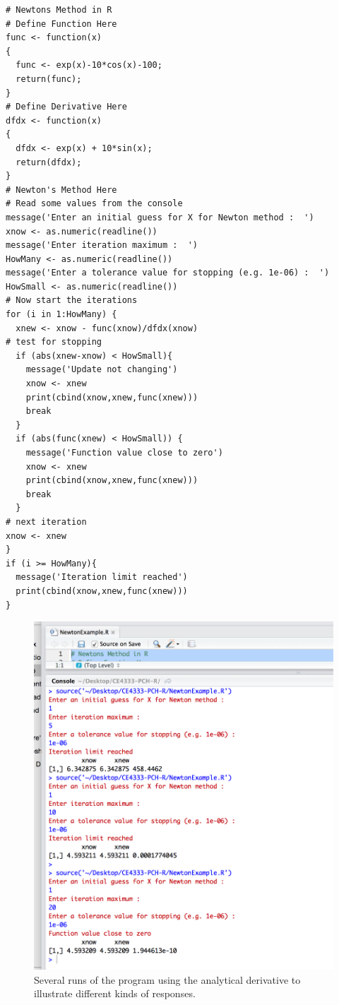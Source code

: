 \newpage
\begin{lstlisting}[caption=R code demonstrating Newton's Method calculations, label=lst:NewtonsMethod]
# Newtons Method in R
# Define Function Here
func <- function(x)
{
  func <- exp(x)-10*cos(x)-100;
  return(func);
}
# Define Derivative Here
dfdx <- function(x)
{
  dfdx <- exp(x) + 10*sin(x); 
  return(dfdx);
}
# Newton's Method Here
# Read some values from the console
message('Enter an initial guess for X for Newton method :  ')
xnow <- as.numeric(readline())
message('Enter iteration maximum :  ')
HowMany <- as.numeric(readline())
message('Enter a tolerance value for stopping (e.g. 1e-06) :  ')
HowSmall <- as.numeric(readline())
# Now start the iterations
for (i in 1:HowMany) {
  xnew <- xnow - func(xnow)/dfdx(xnow)
# test for stopping
  if (abs(xnew-xnow) < HowSmall){
    message('Update not changing')
    xnow <- xnew
    print(cbind(xnow,xnew,func(xnew)))
    break
  }
  if (abs(func(xnew) < HowSmall)) {
    message('Function value close to zero')
    xnow <- xnew
    print(cbind(xnow,xnew,func(xnew)))
    break    
  }
# next iteration
xnow <- xnew
}
if (i >= HowMany){
  message('Iteration limit reached')
  print(cbind(xnow,xnew,func(xnew)))
}
\end{lstlisting}

\begin{figure}[h!] %
   \centering
   \includegraphics[width=6in]{./3-Differentation/NewtonTrials.jpg} 
   \caption{Several runs of the program using the analytical derivative to illustrate different kinds of responses.}
   \label{fig:NewtonTrials}
\end{figure}

